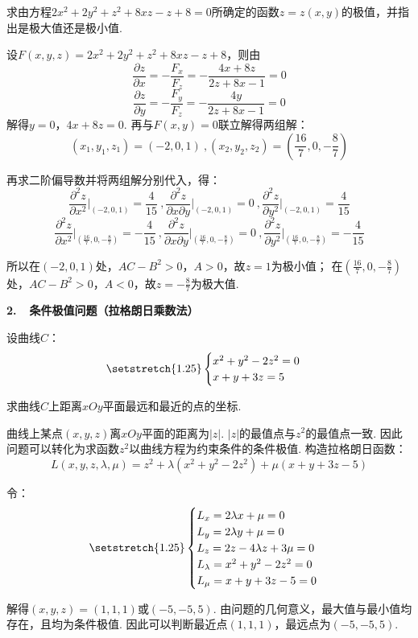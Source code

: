 \begin{example}
\label{ex:ch06-24}
求由方程$2x^2 + 2y^2 + z^2 + 8xz - z + 8=0$所确定的函数$z = z(x,y)$的极值，并指出是极大值还是极小值.
\end{example}

\begin{solution}
设$F(x,y,z) = 2x^2 + 2y^2 + z^2 + 8xz - z + 8$，则由
$$
\frac{\partial z}{\partial x} = -\frac{F_x}{F_z} = -\frac{4x+8z}{2z+8x-1} =0
$$
$$
\frac{\partial z}{\partial y} = -\frac{F_y}{F_z} = -\frac{4y}{2z+8x-1} =0
$$
解得$y=0$，$4x+8z=0$.
再与$F(x,y)=0$联立解得两组解：
$$
(x_1,y_1,z_1) = (-2,0,1)~,(x_2,y_2,z_2) = (\frac{16}{7},0,-\frac{8}{7})
$$\par
再求二阶偏导数并将两组解分别代入，得：
$$
\frac{\partial^2 z}{\partial x^2} \bigg|_{(-2,0,1)} = \frac{4}{15}
~,\frac{\partial^2 z}{\partial x \partial y} \bigg|_{(-2,0,1)} = 0
~,\frac{\partial^2 z}{\partial y^2} \bigg|_{(-2,0,1)} = \frac{4}{15}
$$
$$
\frac{\partial^2 z}{\partial x^2} \bigg|_{(\frac{16}{7},0,-\frac{8}{7})} = -\frac{4}{15}
~,\frac{\partial^2 z}{\partial x \partial y} \bigg|_{(\frac{16}{7},0,-\frac{8}{7})} = 0
~,\frac{\partial^2 z}{\partial y^2} \bigg|_{(\frac{16}{7},0,-\frac{8}{7})} = - \frac{4}{15}
$$\par
所以在$(-2,0,1)$处，$AC-B^2>0$，$A>0$，故$z=1$为极小值；
在$(\frac{16}{7},0,-\frac{8}{7})$处，$AC-B^2>0$，$A<0$，故$z=-\frac{8}{7}$为极大值.
\end{solution}

\textbf{2.~~条件极值问题（拉格朗日乘数法）}

\begin{example}
\label{ex:ch06-25}
设曲线$C$：
\[ \setstretch{1.25}
\begin{cases}
    x^2 + y^2 - 2z^2 = 0 \\
    x+y+3z=5
\end{cases}
\] \par
求曲线$C$上距离$xOy$平面最远和最近的点的坐标.
\end{example}

\begin{solution}
曲线上某点$(x,y,z)$离$xOy$平面的距离为$|z|$.
$|z|$的最值点与$z^2$的最值点一致.
因此问题可以转化为求函数$z^2$以曲线方程为约束条件的条件极值.
构造拉格朗日函数：
$$
L(x,y,z,\lambda,\mu) = z^2 + \lambda (x^2 + y^2 - 2z^2) + \mu (x+y+3z - 5)
$$\par
令：
\[ \setstretch{1.25}
\begin{cases}
    L_x = 2\lambda x + \mu = 0 \\
    L_y = 2\lambda y + \mu  =0 \\
    L_z = 2z - 4\lambda z + 3\mu =0 \\
    L_\lambda = x^2 + y^2 -2z^2 = 0 \\
    L_\mu = x+y+3z-5 = 0
\end{cases}
\] \par
解得$(x,y,z)=(1,1,1)$或$(-5,-5,5)$.
由问题的几何意义，最大值与最小值均存在，且均为条件极值.
因此可以判断最近点$(1,1,1)$，最远点为$(-5,-5,5)$.
\end{solution}


